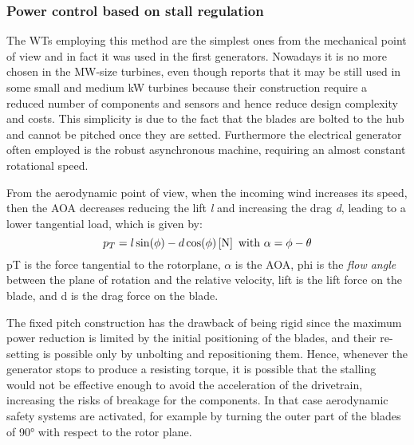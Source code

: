 \subsubsection{Power control based on stall regulation}\label{subsec:stall_regulation_theory}
The \acrshort{WTs} employing this method are the simplest ones from the mechanical point of view and in fact it was used in the first generators. Nowadays it is no more chosen in the MW-size turbines, even though \cite{Grasso_2016} reports that it may be still used in some small and medium kW turbines because their construction require a reduced number of components and sensors and hence reduce design complexity and costs. This simplicity is due to the fact that the blades are bolted to the hub and cannot be pitched once they are setted. Furthermore the electrical generator often employed is the robust asynchronous machine, requiring an almost constant rotational speed.

From the aerodynamic point of view, when the incoming wind increases its speed, then the \acrshort{AOA} decreases reducing the lift \textit{l} and increasing the drag \textit{d}, leading to a lower tangential load, which is given by:
\begin{equation}
  p_T = l \sin(\phi) - d \cos(\phi) \left[\si{\newton}\right] \text{ with } \alpha = \phi - \theta
  \label{eq:tangential_load}
\end{equation}
\acrshort{pT} is the force tangential to the rotorplane, $\alpha$ is the \acrshort{AOA}, \acrshort{phi} is the \textit{flow angle} between the plane of rotation and the relative velocity, \acrshort{lift} is the lift force on the blade, and \acrshort{d} is the drag force on the blade.

The fixed pitch construction has the drawback of being rigid since the maximum power reduction is limited by the initial positioning of the blades, and their re-setting is possible only by unbolting and repositioning them. Hence, whenever the generator stops to produce a resisting torque, it is possible that the stalling would not be effective enough to avoid the acceleration of the drivetrain, increasing the risks of breakage for the components. In that case aerodynamic safety systems are activated, for example by turning the outer part of the blades of 90$\si{\degree}$ with respect to the rotor plane. 

